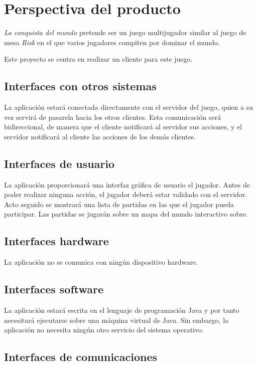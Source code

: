 \section{Perspectiva del producto}

\textit{La conquista del mundo} pretende ser un juego multijugador similar al
juego de mesa \textit{Risk} en el que varios jugadores compiten por dominar el
mundo.

Este proyecto se centra en realizar un cliente para este juego.

\subsection{Interfaces con otros sistemas}

La aplicación estará conectada directamente con el servidor del juego, quien a
su vez servirá de pasarela hacia los otros clientes. Esta comunicación será
bidireccional, de manera que el cliente notificará al servidor sus acciones, y
el servidor notificará al cliente las acciones de los demás clientes.

\subsection{Interfaces de usuario}

La aplicación proporcionará una interfaz gráfica de usuario el jugador. Antes
de poder realizar ninguna acción, el jugador deberá estar validado con el
servidor. Acto seguido se mostrará una lista de partidas en las que el jugador
pueda participar. Las partidas se jugarán sobre un mapa del mundo interactivo
sobre.

\subsection{Interfaces hardware}

La aplicación no se comunica con ningún dispositivo hardware.

\subsection{Interfaces software}

La aplicación estará escrita en el lenguaje de programación Java y por tanto
necesitará ejecutarse sobre una máquina virtual de Java. Sin embargo, la
aplicación no necesita ningún otro servicio del sistema operativo.

\subsection{Interfaces de comunicaciones}

